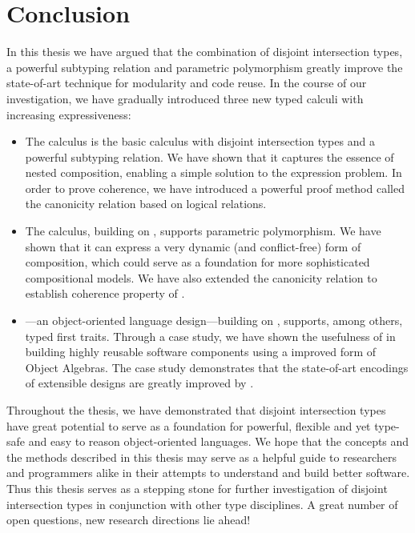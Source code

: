 \chapter{Conclusion}
\label{chap:conclusion}


In this thesis we have argued that the combination of disjoint intersection
types, a powerful subtyping relation and parametric polymorphism greatly improve
the state-of-art technique for modularity and code reuse. In the course of our
investigation, we have gradually introduced three new typed calculi with
increasing expressiveness:
\begin{itemize}
\item The \namee calculus is the basic calculus with disjoint intersection types
  and a powerful subtyping relation. We have shown that it captures the essence
  of nested composition, enabling a simple solution to the expression problem.
  In order to prove coherence, we have introduced a powerful proof method called
  the canonicity relation based on logical relations.
\item The \fnamee calculus, building on \namee, supports parametric
  polymorphism. We have shown that it can express a very dynamic (and
  conflict-free) form of composition, which could serve as a foundation for more
  sophisticated compositional models. We have also extended the canonicity
  relation to establish coherence property of \fnamee.
\item \sedel---an object-oriented language design---building on \fnamee,
  supports, among others, typed first traits. Through a case study, we have
  shown the usefulness of \fnamee in building highly reusable software
  components using a improved form of Object Algebras. The case study
  demonstrates that the state-of-art encodings of extensible designs are greatly
  improved by \fnamee.
\end{itemize}

Throughout the thesis, we have demonstrated that disjoint intersection types have great
potential to serve as a foundation for powerful, flexible and yet type-safe and
easy to reason object-oriented languages. We hope that the concepts and the
methods described in this thesis may serve as a helpful guide to researchers and
programmers alike in their attempts to understand and build better software.
Thus this thesis serves as a stepping stone for further investigation of
disjoint intersection types in conjunction with other type disciplines. A great
number of open questions, new research directions lie ahead!




